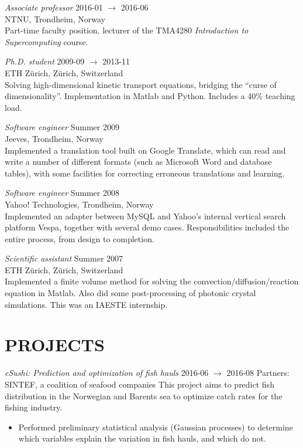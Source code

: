 \documentclass[line,margin]{res}
\newcommand{\zh}{Z\"{u}rich}
\begin{document}
\begin{resume}
{\em Associate professor} \hfill 2016-01 $\to$ 2016-06 \\
NTNU, Trondheim, Norway \\
Part-time faculty position, lecturer of the TMA4280 \emph{Introduction to
  Supercomputing} course.

{\em Ph.D. student} \hfill 2009-09 $\to$ 2013-11 \\
ETH \zh, \zh, Switzerland \\
Solving high-dimensional kinetic transport equations, bridging the ``curse of
dimensionality''. Implementation in Matlab and Python. Includes a 40\% teaching
load.

{\em Software engineer} \hfill Summer 2009 \\
Jeeves, Trondheim, Norway \\
Implemented a translation tool built on Google Translate, which can read and
write a number of different formats (such as Microsoft Word and database
tables), with some facilities for correcting erroneous translations and
learning.

{\em Software engineer} \hfill Summer 2008 \\
Yahoo! Technologies, Trondheim, Norway \\
Implemented an adapter between MySQL and Yahoo's internal vertical search
platform Vespa, together with several demo cases. Responsibilities included the
entire process, from design to completion.

{\em Scientific assistant} \hfill Summer 2007 \\
ETH \zh, \zh, Switzerland \\
Implemented a finite volume method for solving the convection/diffusion/reaction
equation in Matlab. Also did some post-processing of photonic crystal
simulations. This was an IAESTE internship.


\newpage

\section{PROJECTS}

{\em eSushi: Prediction and optimization of fish hauls}
\hfill 2016-06 $\to$ 2016-08
{\small Partners: SINTEF, a coalition of seafood companies}
This project aims to predict fish distribution in the Norwegian and Barents sea
to optimize catch rates for the fishing industry.
\begin{itemize}
\item Performed preliminary statistical analysis (Gaussian processes) to
  determine which variables explain the variation in fish hauls, and which do
  not.
\end{itemize}


\end{resume}
\end{document}
